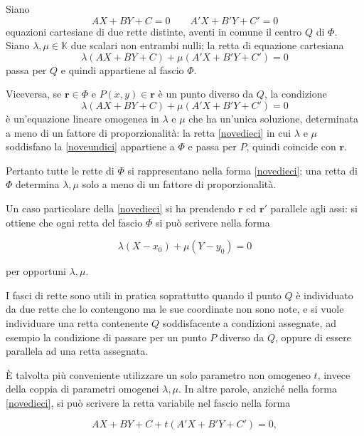 \documentclass{article}
\theoremstyle{plain}
\theoremstyle{definition}
\theoremstyle{remark}
\begin{document}
\vspace{10pt}

Siano
\[AX + BY + C = 0\quad\quad A'X + B'Y + C' = 0\]
equazioni cartesiane di due rette distinte, aventi in comune il centro $Q$ di $\Phi$. 
Siano $\lambda, \mu \in \mathbb{K}$ due scalari non entrambi nulli; la retta di equazione cartesiana
\begin{equation}\label{novedieci}
\lambda (AX + BY + C) + \mu (A'X + B'Y + C') = 0     
\end{equation}
passa per $Q$ e quindi appartiene al fascio $\Phi$.

\vspace{10pt}

Viceversa, se $\mathbf{r} \in \Phi$ e $P(x, y)\in\mathbf{r}$ è un punto diverso da $Q$, la condizione
\begin{equation}\label{noveundici}
    \lambda (AX + BY + C) + \mu (A'X + B'Y + C') = 0 
\end{equation}
è un'equazione lineare omogenea in $\lambda$ e $\mu$ che ha un'unica soluzione, determinata a meno di un fattore di proporzionalità: la retta \ref{novedieci} in cui $\lambda$ e $\mu$ soddisfano la \ref{noveundici} appartiene a $\Phi$ e passa per $P$, quindi coincide con $\mathbf{r}$.

Pertanto tutte le rette di $\Phi$ si rappresentano nella forma \ref{novedieci}; una retta di $\Phi$ determina $\lambda, \mu$ solo a meno di un fattore di proporzionalità.

Un caso particolare della \ref{novedieci} si ha prendendo $\mathbf{r}$ ed $\mathbf{r}'$ parallele agli assi: si ottiene che ogni retta del fascio $\Phi$ si può scrivere nella forma

\[
\lambda(X - x_0) + \mu(Y - y_0) = 0
\]

per opportuni $\lambda, \mu$.

I fasci di rette sono utili in pratica soprattutto quando il punto $Q$ è individuato da due rette che lo contengono ma le sue coordinate non sono note, e si vuole individuare una retta contenente $Q$ soddisfacente a condizioni assegnate, ad esempio la condizione di passare per un punto $P$ diverso da $Q$, oppure di essere parallela ad una retta assegnata.

È talvolta più conveniente utilizzare un solo parametro non omogeneo $t$, invece della coppia di parametri omogenei $\lambda, \mu$. In altre parole, anziché nella forma \ref{novedieci}, si può scrivere la retta variabile nel fascio nella forma

\begin{equation}\label{novedodici}
AX + BY + C + t(A'X + B'Y + C') = 0,
\end{equation}
\end{document}
